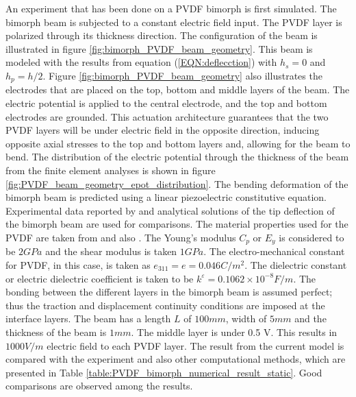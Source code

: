 An experiment that has been done on a PVDF bimorph is first simulated.
The bimorph beam is subjected to a constant electric field input.
The PVDF layer is polarized through its thickness direction.
The configuration of the beam is illustrated in figure \ref{fig:bimorph_PVDF_beam_geometry}.
This beam is modeled with the results from equation (\ref{EQN:deflecction}) with $h_s=0$ and $h_p=h/2$.
Figure \ref{fig:bimorph_PVDF_beam_geometry} also illustrates the electrodes that are placed on the top, bottom and middle layers of the beam.
The electric potential is applied to the central electrode, and the top and bottom electrodes are grounded.
This actuation architecture guarantees that the two PVDF layers will be under electric field in the opposite direction, inducing opposite axial stresses to the top and bottom layers and,
allowing for the beam to bend.
The distribution of the electric potential through the thickness of the beam from the finite element analyses is shown in figure \ref{fig:PVDF_beam_geometry_epot_distribution}.
The bending deformation of the bimorph beam is predicted using a linear piezoelectric constitutive equation.
Experimental data reported by \cite{tzou1991distributed} and analytical solutions \cite{raey,franco2000modelling,suleman1995simple} of the tip deflection of the bimorph beam are used for comparisons.
The material properties used for the PVDF are taken from \cite{suleman1995simple} and also \cite{franco2000modelling}.
The Young's modulus $C_p$ or $E_y$ is considered to be $2 GPa$ and the shear modulus is taken $1GPa$.
The electro-mechanical constant for PVDF, in this case, is taken as $e_{311}=e=0.046 C/m^2$.
The dielectric constant or electric dielectric coefficient is taken to be $ k^\varepsilon = 0.1062 \times 10^{-8} F/m$.
The bonding between the different layers in the bimorph beam is assumed perfect;
thus the traction and displacement continuity conditions are imposed at the interface layers.
The beam has a length $L$ of $100mm$, width of $5mm$ and the thickness of the beam is $1mm$.
The middle layer is under 0.5 V.
This results in $1000 V/m$ electric field to each PVDF layer.
The result from the current model is compared with the experiment and also other computational methods, which are presented in Table \ref{table:PVDF_bimorph_numerical_result_static}.
Good comparisons are observed among the results.

